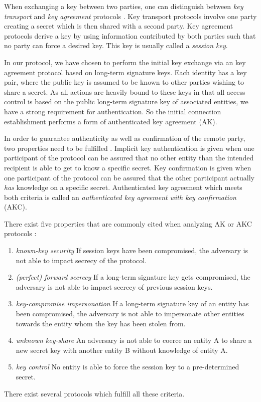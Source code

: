 When exchanging a key between two parties, one can distinguish between \emph{key transport} and \emph{key agreement} protocols \cite{menezes1996handbook}.
Key transport protocols involve one party creating a secret which is then shared with a second party.
Key agreement protocols derive a key by using information contributed by both parties such that no party can force a desired key.
This key is usually called a \emph{session key}.

In our protocol, we have chosen to perform the initial key exchange via an key agreement protocol based on long-term signature keys.
Each identity has a key pair, where the public key is assumed to be known to other parties wishing to share a secret.
As all actions are heavily bound to these keys in that all access control is based on the public long-term signature key of associated entities, we have a strong requirement for authentication.
So the initial connection establishment performs a form of authenticated key agreement (AK).

In order to guarantee authenticity as well as confirmation of the remote party, two properties need to be fulfilled \cite{law2003efficient}.
Implicit key authentication is given when one participant of the protocol can be assured that no other entity than the intended recipient is able to get to know a specific secret.
Key confirmation is given when one participant of the protocol can be assured that the other participant actually \emph{has} knowledge on a specific secret.
Authenticated key agreement which meets both criteria is called an \emph{authenticated key agreement with key confirmation} (AKC).

There exist five properties that are commonly cited when analyzing AK or AKC protocols \cite{menezes1996handbook,blake1997key,law2003efficient}:
\begin{enumerate}
    \item \emph{known-key security}
        If session keys have been compromised, the adversary is not able to impact secrecy of the protocol.
    \item \emph{(perfect) forward secrecy}
        If a long-term signature key gets compromised, the adversary is not able to impact secrecy of previous session keys.
    \item \emph{key-compromise impersonation}
        If a long-term signature key of an entity has been compromised, the adversary is not able to impersonate other entities towards the entity whom the key has been stolen from.
    \item \emph{unknown key-share}
        An adversary is not able to coerce an entity A to share a new secret key with another entity B without knowledge of entity A.
    \item \emph{key control}
        No entity is able to force the session key to a pre-determined secret.
\end{enumerate}
There exist several protocols which fulfill all these criteria.

